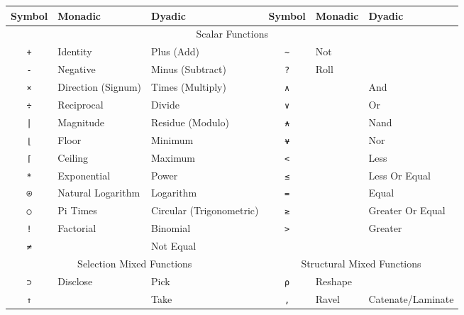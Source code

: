 \documentclass[numbers,9pt]{sigplanconf}
\begin{document}
\begin{table*}
\centering
\begin{tabular}{cllcll}
\toprule
Symbol                   & Monadic            & Dyadic  &
Symbol                   & Monadic            & Dyadic  \\
\midrule
\multicolumn{6}{c}{Scalar Functions} \\ 
\midrule
\texttt{+}               & Identity           & Plus (Add) &
\texttt{\textasciitilde} & Not                & \\
\texttt{-}               & Negative           & Minus (Subtract) &
\texttt{?}               & Roll               & \\
\texttt{×}               & Direction (Signum) & Times (Multiply) &
\texttt{∧}               &                    & And \\
\texttt{÷}               & Reciprocal         & Divide &
\texttt{∨}               &                    & Or \\
\texttt{|}               & Magnitude          & Residue (Modulo) &
\texttt{⍲}               &                    & Nand \\
\texttt{⌊}               & Floor              & Minimum &
\texttt{⍱}               &                    & Nor \\
\texttt{⌈}               & Ceiling            & Maximum &
\texttt{<}               &                    & Less \\
\texttt{*}               & Exponential        & Power &
\texttt{≤}               &                    & Less Or Equal \\
\texttt{⍟}               & Natural Logarithm  & Logarithm &
\texttt{=}               &                    & Equal \\
\texttt{○}               & Pi Times           & Circular (Trigonometric) &
\texttt{≥}               &                    & Greater Or Equal \\
\texttt{!}               & Factorial          & Binomial &
\texttt{>}               &                    & Greater \\
\texttt{≠}               &                    & Not Equal \\
\midrule
\multicolumn{3}{c}{Selection Mixed Functions} &
\multicolumn{3}{c}{Structural Mixed Functions} \\
\cmidrule(r){1-3} \cmidrule(l){4-6}
\texttt{⊃}               & Disclose & Pick &
\texttt{⍴} & Reshape       & \\
\texttt{↑}               &          & Take &
\texttt{,} & Ravel         & Catenate/Laminate \\

\end{tabular}
\end{table*}
\end{document}

